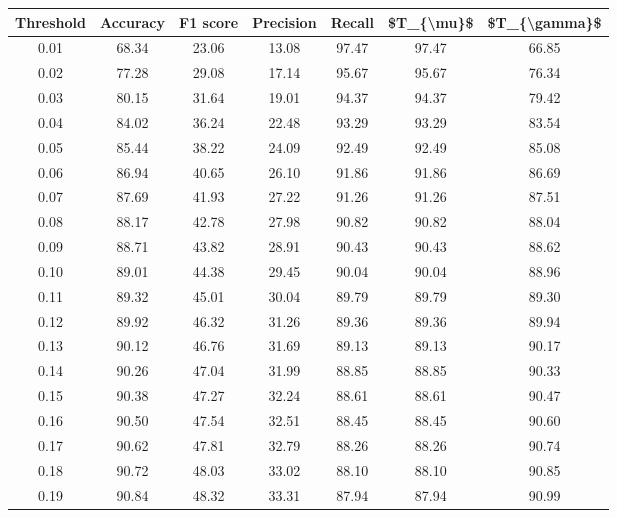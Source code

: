\begin{tabular}{|c|c|c|c|c|c|c|}
\hline
 Threshold &  Accuracy &  F1 score &  Precision &  Recall &  \$T\_\{\textbackslash mu\}\$ &  \$T\_\{\textbackslash gamma\}\$ \\
\hline
      0.01 &     68.34 &     23.06 &      13.08 &   97.47 &      97.47 &         66.85 \\
      0.02 &     77.28 &     29.08 &      17.14 &   95.67 &      95.67 &         76.34 \\
      0.03 &     80.15 &     31.64 &      19.01 &   94.37 &      94.37 &         79.42 \\
      0.04 &     84.02 &     36.24 &      22.48 &   93.29 &      93.29 &         83.54 \\
      0.05 &     85.44 &     38.22 &      24.09 &   92.49 &      92.49 &         85.08 \\
      0.06 &     86.94 &     40.65 &      26.10 &   91.86 &      91.86 &         86.69 \\
      0.07 &     87.69 &     41.93 &      27.22 &   91.26 &      91.26 &         87.51 \\
      0.08 &     88.17 &     42.78 &      27.98 &   90.82 &      90.82 &         88.04 \\
      0.09 &     88.71 &     43.82 &      28.91 &   90.43 &      90.43 &         88.62 \\
      0.10 &     89.01 &     44.38 &      29.45 &   90.04 &      90.04 &         88.96 \\
      0.11 &     89.32 &     45.01 &      30.04 &   89.79 &      89.79 &         89.30 \\
      0.12 &     89.92 &     46.32 &      31.26 &   89.36 &      89.36 &         89.94 \\
      0.13 &     90.12 &     46.76 &      31.69 &   89.13 &      89.13 &         90.17 \\
      0.14 &     90.26 &     47.04 &      31.99 &   88.85 &      88.85 &         90.33 \\
      0.15 &     90.38 &     47.27 &      32.24 &   88.61 &      88.61 &         90.47 \\
      0.16 &     90.50 &     47.54 &      32.51 &   88.45 &      88.45 &         90.60 \\
      0.17 &     90.62 &     47.81 &      32.79 &   88.26 &      88.26 &         90.74 \\
      0.18 &     90.72 &     48.03 &      33.02 &   88.10 &      88.10 &         90.85 \\
      0.19 &     90.84 &     48.32 &      33.31 &   87.94 &      87.94 &         90.99 \\

\end{tabular}
